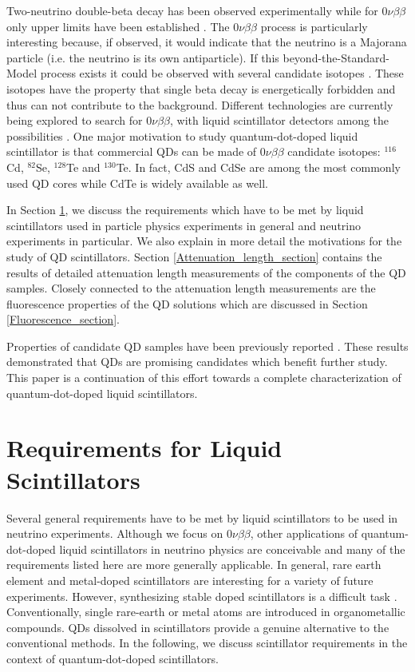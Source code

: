 \documentclass[cits]{JINST}
\begin{document}
Two-neutrino double-beta decay has been observed experimentally while for 0$\nu\beta\beta$ only upper limits have been established \cite{barabash2011,gerda,kamlandzen,exo}. The 0$\nu\beta\beta$ process is particularly interesting because, if observed, it would indicate that the neutrino is a Majorana particle (i.e. the neutrino is its own antiparticle). If this beyond-the-Standard-Model process exists it could be observed with several candidate isotopes \cite{vogel2002}. These isotopes have the property that single beta decay is energetically forbidden and thus can not contribute to the background. Different technologies are currently being explored to search for 0$\nu\beta\beta$, with liquid scintillator detectors among the possibilities \cite{kamlandzen,snoplus}. One major motivation to study quantum-dot-doped liquid scintillator is that commercial QDs can be made of 0$\nu\beta\beta$ candidate isotopes: $^{116}$Cd, $^{82}$Se, $^{128}$Te and $^{130}$Te. In fact, CdS and CdSe are among the most commonly used QD cores while CdTe is widely available as well.

In Section \ref{Requirements_section}, we discuss the requirements which have to be met by liquid scintillators used in particle physics experiments in general and neutrino experiments in particular. We also explain in more detail the motivations for the study of QD scintillators. Section \ref{Attenuation_length_section} contains the results of detailed attenuation length measurements of the components of the QD samples. Closely connected to the attenuation length measurements are the fluorescence properties of the QD solutions which are discussed in Section \ref{Fluorescence_section}. 

Properties of candidate QD samples have been previously reported \cite{mitpaper}. These results demonstrated that QDs are promising candidates which benefit further study. This paper is a continuation of this effort towards a complete characterization of quantum-dot-doped liquid scintillators. 


\section{Requirements for Liquid Scintillators}\label{Requirements_section}
Several general requirements have to be met by liquid scintillators to be used in neutrino experiments. Although we focus on 0$\nu\beta\beta$, other applications of quantum-dot-doped liquid scintillators in neutrino physics are conceivable \cite{mitpaper} and many of the requirements listed here are more generally applicable. In general, rare earth element and metal-doped scintillators are interesting for a variety of future experiments. However, synthesizing stable doped scintillators is a difficult task \cite{gd_mpik,chooz,piepke}. Conventionally, single rare-earth or metal atoms are introduced in organometallic compounds. QDs dissolved in scintillators provide a genuine alternative to the conventional methods. In the following, we discuss scintillator requirements in the context of quantum-dot-doped scintillators.  
\end{document}
